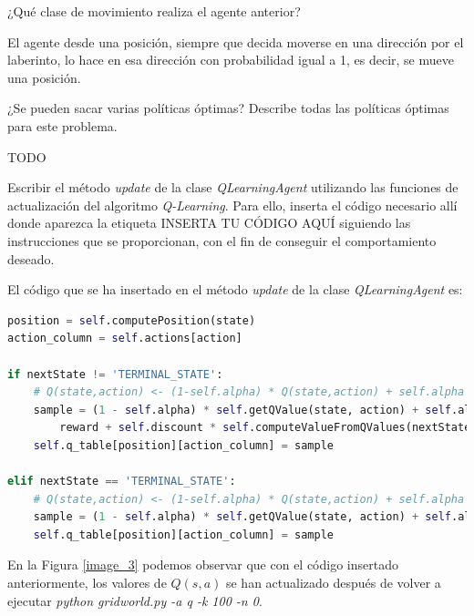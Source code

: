 \documentclass[11pt]{exam}
\begin{document}
\begin{questions}
{ \question ¿Qué clase de movimiento realiza el agente anterior?}

El agente desde una posición, siempre que decida moverse en una dirección por el laberinto, lo hace en esa dirección con probabilidad igual a 1, es decir, se mueve una posición.

{ \question ¿Se pueden sacar varias políticas óptimas? Describe todas las políticas óptimas para este problema.} 

TODO

{ \question Escribir el método \textit{update} de la clase \textit{QLearningAgent} utilizando las funciones de actualización del algoritmo \textit{Q-Learning}. Para ello, inserta el código necesario allí donde aparezca la etiqueta INSERTA TU CÓDIGO AQUÍ siguiendo las instrucciones que se proporcionan, con el fin de conseguir el comportamiento deseado. }

El código que se ha insertado en el método \textit{update} de la clase \textit{QLearningAgent} es:

\begin{lstlisting}[language=Python]
position = self.computePosition(state)
action_column = self.actions[action]

if nextState != 'TERMINAL_STATE':
	# Q(state,action) <- (1-self.alpha) * Q(state,action) + self.alpha * (reward + self.discount * max a' Q(nextState, a'))
	sample = (1 - self.alpha) * self.getQValue(state, action) + self.alpha * (
		reward + self.discount * self.computeValueFromQValues(nextState))
	self.q_table[position][action_column] = sample

elif nextState == 'TERMINAL_STATE':
	# Q(state,action) <- (1-self.alpha) * Q(state,action) + self.alpha * (reward + 0)
	sample = (1 - self.alpha) * self.getQValue(state, action) + self.alpha * (reward + 0)
	self.q_table[position][action_column] = sample
\end{lstlisting}

En la Figura \ref{image_3} podemos observar que con el código insertado anteriormente, los valores de $Q(s,a)$ se han actualizado después de volver a ejecutar \textit{python gridworld.py -a q -k 100 -n 0}.


\end{questions}
\end{document}
